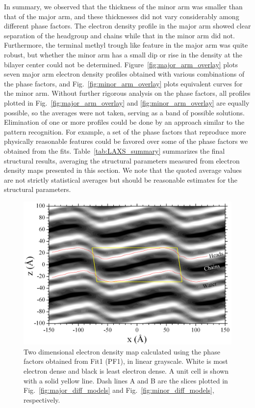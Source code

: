In summary, we observed that the thickness of the minor arm was 
smaller than that of the major arm, and these thicknesses did not vary 
considerably among different phase factors. 
The electron density profile in the major 
arm showed clear separation of the headgroup and chains while that in the minor 
arm did not. 
Furthermore, the terminal methyl trough like feature in the major arm was 
quite robust, but 
whether the minor arm has a small dip or rise in the density at the bilayer center
could not be determined. 
Figure~\ref{fig:major_arm_overlay} plots seven major arm electron density profiles 
obtained with various combinations of the phase factors, and
Fig.~\ref{fig:minor_arm_overlay} plots equivalent curves for the minor arm.
Without further rigorous analysis on the phase factors, 
all profiles plotted in Fig.~\ref{fig:major_arm_overlay} and 
\ref{fig:minor_arm_overlay} are equally possible, 
so the averages were not taken, serving as a band of possible solutions.
Elimination of one or more profiles could be done by an approach
similar to the pattern recognition. For example, a set of the 
phase factors that reproduce more physically reasonable features 
could be favored over some of the phase factors we obtained from the fits.
Table~\ref{tab:LAXS_summary} summarizes
the final structural results, averaging the structural parameters
measured from electron density maps presented in this section.
We note that the quoted average values are not strictly statistical averages
but should be reasonable estimates for the structural parameters.

\begin{landscape}
\begin{figure}
  \centering
  \includegraphics[width=0.85\linewidth]{figures/ripple/LAXS/Fit1_2D_edp}
  \caption[]{Two dimensional electron density map calculated using the phase
  factors obtained from Fit1 (PF1), in linear grayscale.
  White is most electron dense and black is least electron dense. 
  A unit cell is shown with a solid yellow line. 
  Dash lines A and B are the slices plotted in  Fig.~\ref{fig:major_diff_models} 
  and Fig.~\ref{fig:minor_diff_models}, respectively.}
  \label{fig:PF1_2D_edp}
\end{figure}
\end{landscape}

